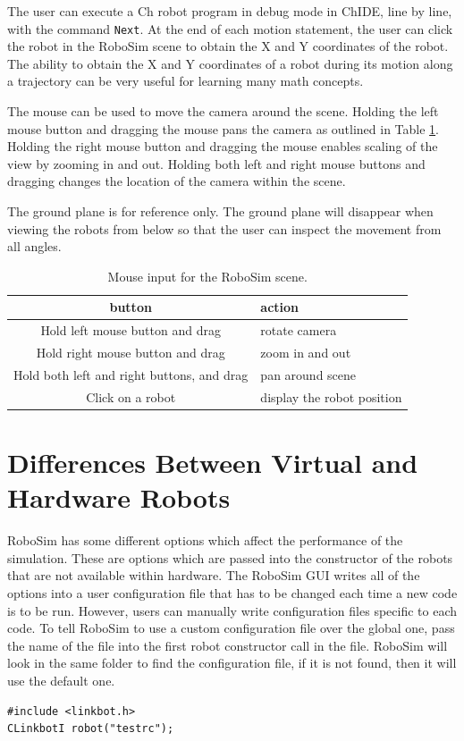 \documentclass{article}
\begin{document}
The user can execute a Ch robot program in debug mode in ChIDE, line by line,
with the command {\tt Next}. At the end of each motion statement, the user can
click the robot in the RoboSim scene to obtain the X and Y coordinates of the
robot.  The ability to obtain the X and Y coordinates of a robot during its
motion along a trajectory can be very useful for learning many math concepts.

The mouse can be used to move the camera around the scene.  Holding the left
mouse button and dragging the mouse pans the camera as outlined in Table
\ref{tab:buttons}.  Holding the right mouse button and dragging the mouse
enables scaling of the view by zooming in and out.  Holding both left and right
mouse buttons and dragging changes the location of the camera within the scene.

The ground plane is for reference only.  The ground plane will disappear when
viewing the robots from below so that the user can inspect the movement from all
angles.

\begin{table}[H]
	\begin{center}
	\begin{tabular}{c | l }
		\hline \hline
		\textbf{button} & \textbf{action} \\ \hline
		Hold left mouse button and drag& rotate camera \\
		Hold right mouse button and drag& zoom in and out \\
		Hold both left and right buttons,  and drag & pan around scene \\
		Click on a robot & display the robot position\\
		\hline \hline
	\end{tabular}
	\caption{Mouse input for the RoboSim scene.}
	\label{tab:buttons}
	\end{center}
\end{table}

%
%
\section{Differences Between Virtual and Hardware Robots}
RoboSim has some different options which affect the performance of the
simulation.  These are options which are passed into the constructor of the
robots that are not available within hardware.  The RoboSim GUI writes all of
the options into a user configuration file that has to be changed each time a
new code is to be run.  However, users can manually write configuration files
specific to each code.  To tell RoboSim to use a custom configuration file over
the global one, pass the name of the file into the first robot constructor call
in the file.  RoboSim will look in the same folder to find the configuration
file, if it is not found, then it will use the default one.
\begin{verbatim}
#include <linkbot.h>
CLinkbotI robot("testrc");
\end{verbatim}
\end{document}
